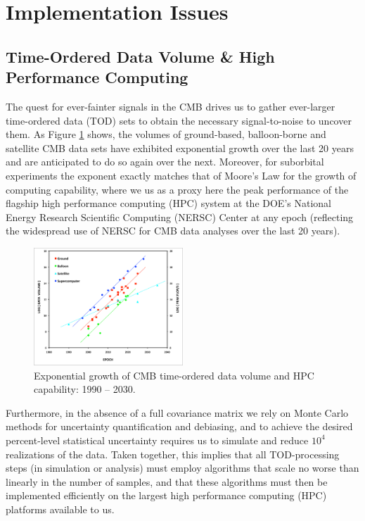  
\section{Implementation Issues}

\subsection{Time-Ordered Data Volume \& High Performance Computing}

The quest for ever-fainter signals in the CMB drives us to gather ever-larger time-ordered data (TOD) sets to obtain the necessary signal-to-noise to uncover them. As Figure \ref{fig_cmb_hpc_scaling} shows, the volumes of ground-based, balloon-borne and satellite CMB data sets have exhibited exponential growth over the last 20 years and are anticipated to do so again over the next. Moreover, for suborbital experiments the exponent exactly matches that of Moore's Law for the growth of computing capability, where we us as a proxy here the peak performance of the flagship high performance computing (HPC) system at the DOE's National Energy Research Scientific Computing (NERSC) Center at any epoch (reflecting the widespread use of NERSC for CMB data analyses over the last 20 years). 

\begin{figure}[htbp]
\centering
\includegraphics[width=0.5\textwidth]{Analysis/cmb_hpc_scaling}
\caption{Exponential growth of CMB time-ordered data volume and HPC capability: 1990 -- 2030.}
\label{fig_cmb_hpc_scaling}
\end{figure}

Furthermore, in the absence of a full covariance matrix we rely on Monte Carlo methods for uncertainty quantification and debiasing, and to achieve the desired percent-level statistical uncertainty requires us to simulate and reduce $10^4$ realizations of the data. Taken together, this implies that all TOD-processing steps (in simulation or analysis) must employ algorithms that scale no worse than linearly in the number of samples, and that these algorithms must then be implemented efficiently on the largest high performance computing (HPC) platforms available to us. 


